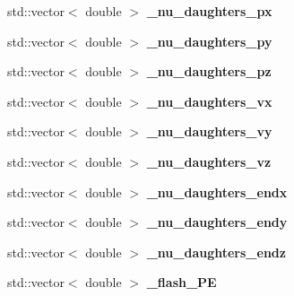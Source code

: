 \begin{DoxyCompactItemize}
\item 
\hypertarget{group__lee_gaa834071311edb5ffa50db6132496fb95}{std\-::vector$<$ double $>$ {\bfseries \-\_\-nu\-\_\-daughters\-\_\-px}}\label{group__lee_gaa834071311edb5ffa50db6132496fb95}

\item 
\hypertarget{group__lee_ga3e2b79305694205bc16527e7d086058a}{std\-::vector$<$ double $>$ {\bfseries \-\_\-nu\-\_\-daughters\-\_\-py}}\label{group__lee_ga3e2b79305694205bc16527e7d086058a}

\item 
\hypertarget{group__lee_ga838abd41f7c806c0242d1d612e1a3c80}{std\-::vector$<$ double $>$ {\bfseries \-\_\-nu\-\_\-daughters\-\_\-pz}}\label{group__lee_ga838abd41f7c806c0242d1d612e1a3c80}

\item 
\hypertarget{group__lee_ga35e3d0f602ee460d83440447698baef1}{std\-::vector$<$ double $>$ {\bfseries \-\_\-nu\-\_\-daughters\-\_\-vx}}\label{group__lee_ga35e3d0f602ee460d83440447698baef1}

\item 
\hypertarget{group__lee_gaa564f473e072ce7fc9702781805907bd}{std\-::vector$<$ double $>$ {\bfseries \-\_\-nu\-\_\-daughters\-\_\-vy}}\label{group__lee_gaa564f473e072ce7fc9702781805907bd}

\item 
\hypertarget{group__lee_gadda9ce5e644a8f78ef769f443990ab20}{std\-::vector$<$ double $>$ {\bfseries \-\_\-nu\-\_\-daughters\-\_\-vz}}\label{group__lee_gadda9ce5e644a8f78ef769f443990ab20}

\item 
\hypertarget{group__lee_ga2c05930087430260a4ba4f26beb8355b}{std\-::vector$<$ double $>$ {\bfseries \-\_\-nu\-\_\-daughters\-\_\-endx}}\label{group__lee_ga2c05930087430260a4ba4f26beb8355b}

\item 
\hypertarget{group__lee_gafdefa43fde43f949f6b6af3e908cb1e2}{std\-::vector$<$ double $>$ {\bfseries \-\_\-nu\-\_\-daughters\-\_\-endy}}\label{group__lee_gafdefa43fde43f949f6b6af3e908cb1e2}

\item 
\hypertarget{group__lee_ga0c2eb616df5aa07c601d0bc72399c636}{std\-::vector$<$ double $>$ {\bfseries \-\_\-nu\-\_\-daughters\-\_\-endz}}\label{group__lee_ga0c2eb616df5aa07c601d0bc72399c636}

\item 
\hypertarget{group__lee_ga9320e2f0e9a7e201a978a21a2eb74a39}{std\-::vector$<$ double $>$ {\bfseries \-\_\-flash\-\_\-\-P\-E}}\label{group__lee_ga9320e2f0e9a7e201a978a21a2eb74a39}


\end{DoxyCompactItemize}
